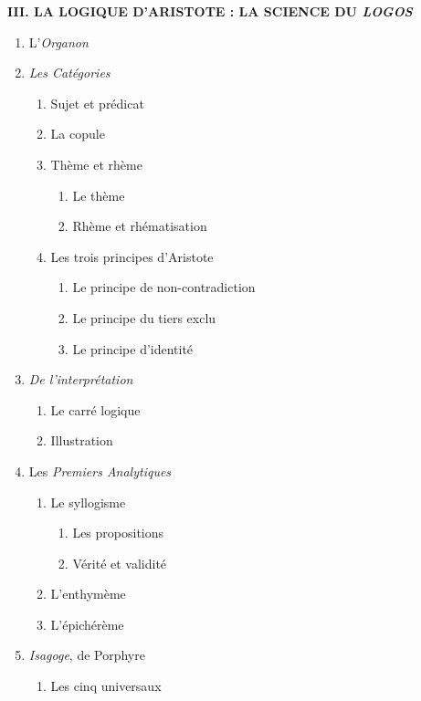 \begin{keybox}
\begin{enumerate}[label=\arabic*.]
\end{enumerate}
\textbf{III. LA LOGIQUE D’ARISTOTE : LA SCIENCE DU \textit{LOGOS}}
\begin{enumerate}[label=\arabic*.]
\item L’\textit{Organon}
\item \textit{Les Catégories}
\begin{enumerate}[label=\textcircled{\scriptsize\arabic*}]
\item Sujet et prédicat
\item La copule
\item Thème et rhème
\begin{enumerate}[label=\arabic*.]
\item Le thème
\item Rhème et rhématisation
\end{enumerate}
\item Les trois principes d’Aristote
\begin{enumerate}[label=\arabic*.]
\item Le principe de non-contradiction
\item Le principe du tiers exclu
\item Le principe d’identité
\end{enumerate}
\end{enumerate}
\item \textit{De l’interprétation}
\begin{enumerate}[label=\textcircled{\scriptsize\arabic*}]
\item Le carré logique
\item Illustration
\end{enumerate}
\item Les \textit{Premiers Analytiques}
\begin{enumerate}[label=\textcircled{\scriptsize\arabic*}]
\item Le syllogisme
\begin{enumerate}[label=\arabic*.]
\item Les propositions
\item Vérité et validité
\end{enumerate}
\item L’enthymème
\item L’épichérème
\end{enumerate}
\item \textit{Isagoge}, de Porphyre
\begin{enumerate}[label=\textcircled{\scriptsize\arabic*}]
\item Les cinq universaux

\end{enumerate}
\end{enumerate}
\end{keybox}
